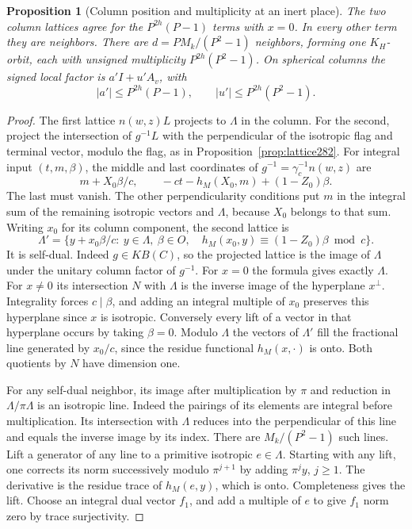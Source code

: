 \documentclass[a4paper,11pt]{article}
\newtheorem{proposition}{Proposition}[section]
\theoremstyle{definition}
\theoremstyle{remark}
\numberwithin{equation}{section}
\begin{document}
\begin{proposition}[Column position and multiplicity at an inert place]\leavevmode
\label{prop:neighbors289}
The two column lattices agree for the \(P^{2h}(P-1)\)
terms with \(x=0\). In every other term they are neighbors.
There are \(d=P M_k/(P^2-1)\) neighbors, forming one
\(K_H\)-orbit, each with unsigned multiplicity
\(P^{2h}(P^2-1)\). On spherical columns the signed local
factor is \(a'I+u'A_v\), with
\[
       |a'|\le P^{2h}(P-1),\qquad
       |u'|\le P^{2h}(P^2-1).
\]
\end{proposition}
\begin{proof}
The first lattice \(n(w,z)L\) projects to \(\Lambda\) in the
column. For the second, project the intersection of \(g^{-1}L\)
with the perpendicular of the isotropic flag and terminal
vector, modulo the flag, as in Proposition~\ref{prop:lattice282}.
For integral input \((t,m,\beta)\), the middle and last
coordinates of \(g^{-1}=\gamma_c^{-1}n(w,z)\) are
\[
 m+X_0\beta/c,\qquad -ct-h_M(X_0,m)+(1-Z_0)\beta .
\]
The last must vanish. The other perpendicularity conditions
put \(m\) in the integral sum of the remaining isotropic
vectors and \(\Lambda\), because \(X_0\) belongs to that sum.
Writing \(x_0\) for its column component, the second lattice is
\[
 \Lambda'=\{y+x_0\beta/c:\ y\in\Lambda,\ \beta\in O,\quad
              h_M(x_0,y)\equiv(1-Z_0)\beta\bmod c\}.
\]
It is self-dual. Indeed \(g\in K B(C)\), so the projected
lattice is the image of \(\Lambda\) under the unitary column
factor of \(g^{-1}\). For \(x=0\) the formula gives exactly
\(\Lambda\). For \(x\ne0\) its intersection \(N\) with
\(\Lambda\) is the inverse image of the hyperplane \(x^\perp\).
Integrality forces \(c\mid\beta\), and adding an integral
multiple of \(x_0\) preserves this hyperplane since \(x\)
is isotropic. Conversely every lift of a vector in that
hyperplane occurs by taking \(\beta=0\).
Modulo \(\Lambda\) the vectors of \(\Lambda'\) fill the
fractional line generated by \(x_0/c\), since the residue
functional \(h_M(x,\cdot)\) is onto. Both quotients by \(N\)
have dimension one.

For any self-dual neighbor, its image after multiplication by
\(\pi\) and reduction in \(\Lambda/\pi\Lambda\) is an isotropic
line. Indeed the pairings of its elements are integral before
multiplication. Its intersection with \(\Lambda\) reduces
into the perpendicular of this line and equals the inverse
image by its index. There are \(M_k/(P^2-1)\) such lines.
Lift a generator of any line to a primitive isotropic
\(e\in\Lambda\). Starting with any lift, one corrects its
norm successively modulo \(\pi^{j+1}\) by adding \(\pi^j y\),
\(j\ge1\). The derivative is the residue trace of
\(h_M(e,y)\), which is onto. Completeness gives the lift.
Choose an integral dual vector \(f_1\), and add a multiple of
\(e\) to give \(f_1\) norm zero by trace surjectivity.


\end{proof}
\end{document}
